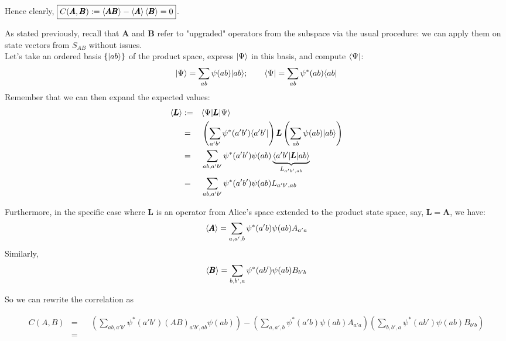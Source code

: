 \documentclass[solutions.tex]{subfiles}
\begin{document}
Hence clearly, $\boxed{C(\pmb{A},\pmb{B}) :=
\left\langle \pmb{AB} \right\rangle - \left\langle \pmb{A} \right\rangle\left\langle \pmb{B} \right\rangle = 0}$.


\iffalse
\hr

As stated previously, recall that $\bm{A}$ and $\bm{B}$ refer
to "upgraded" operators from the subspace via the usual procedure:
we can apply them on state vectors from $S_{AB}$ without issues. \\

Let's take an ordered basis $\{|ab\rangle\}$ of the product space,
express $|\Psi\rangle$ in this basis, and compute $\langle \Psi|$:
\[
	|\Psi\rangle = \sum_{ab}\psi(ab)|ab\rangle;\qquad
		\langle \Psi| = \sum_{ab}\psi^*(ab)\langle ab|
\]
Remember that we can then expand the expected values:
\begin{equation*}\begin{aligned}
	\left\langle \pmb{L} \right\rangle &:=&& \langle \Psi|\pmb{L}|\Psi\rangle \\
	~ &=&&
		\left(\sum_{a'b'}\psi^*(a'b')\langle a'b'|\right)
		\pmb{L}
		\left(\sum_{ab}\psi(ab)|ab\rangle\right) \\
	~ &=&& \sum_{ab,a'b'} \psi^*(a'b')\psi(ab)
		\underbrace{\langle a'b'|\pmb{L}|ab\rangle}_{L_{a'b',ab}} \\
	~ &=&& \sum_{ab,a'b'} \psi^*(a'b')\psi(ab)L_{a'b',ab} \\
\end{aligned}\end{equation*}

Furthermore, in the specific case where $\bm{L}$ is an operator
from Alice's space extended to the product state space, say, $\bm{L} = \bm{A}$,
we have:
\[
	\left\langle \pmb{A} \right\rangle = \sum_{a,a',b}\psi^*(a'b)\psi(ab)A_{a'a}
\]
Similarly,
\[
	\left\langle \pmb{B} \right\rangle = \sum_{b,b',a}\psi^*(ab')\psi(ab)B_{b'b}
\]

So we can rewrite the correlation as

\begin{equation*}\begin{aligned}
	C(A, B) &=&& \left(\sum_{ab,a'b'}\psi^*(a'b')(AB)_{a'b',ab}\psi(ab)\right)
		-\left(
			\sum_{a,a',b}\psi^*(a'b)\psi(ab)A_{a'a}
		\right)
		\left(
			\sum_{b,b',a}\psi^*(ab')\psi(ab)B_{b'b}
		\right)
		\\
	~ &=&&
\end{aligned}\end{equation*}
\end{document}
